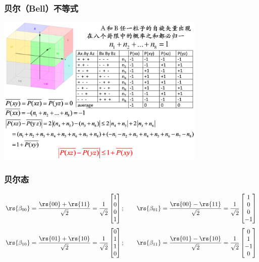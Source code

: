 \begin{frame}
    \frametitle{贝尔（Bell）不等式}
    \begin{center}
        \includegraphics[width=0.75\textwidth]{figs/29a.png}
    \end{center}
\end{frame} 

\begin{frame} 
    \frametitle{贝尔态}
    \[\rs{\beta_{00}}=\frac{\rs{00}+\rs{11}}{\sqrt{2}} =\frac{1}{\sqrt{2}} \begin{bmatrix}
        1 \\
        0 \\
        0 \\
        1
     \end{bmatrix} ; \qquad \rs{\beta_{01}}=\frac{\rs{00}-\rs{11}}{\sqrt{2}} = \frac{1}{\sqrt{2}} \begin{bmatrix}
        1 \\
        0 \\
        0 \\
        -1
     \end{bmatrix} \]
    \[\rs{\beta_{10}}=\frac{\rs{01}+\rs{10}}{\sqrt{2}} =\frac{1}{\sqrt{2}} \begin{bmatrix}
        0 \\
        1 \\
        1 \\
        0
     \end{bmatrix} ; \qquad \rs{\beta_{11}}=\frac{\rs{01}-\rs{10}}{\sqrt{2}} =\frac{1}{\sqrt{2}} \begin{bmatrix}
        0 \\
        1 \\
        -1 \\
        0
     \end{bmatrix} \]
\end{frame}

